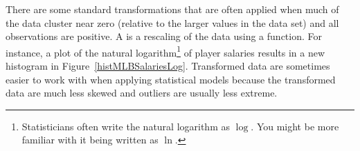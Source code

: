 There are some standard transformations that are often applied when much of the data cluster near zero (relative to the larger values in the data set) and all observations are positive. A  is a rescaling of the data using a function. For instance, a plot of the natural logarithm\footnote{Statisticians often write the natural logarithm as $\log$. You might be more familiar with it being written as $\ln$.} of player salaries results in a new histogram in Figure~\ref{histMLBSalariesLog}. Transformed data are sometimes easier to work with when applying statistical models because the transformed data are much less skewed and outliers are usually less extreme. %


